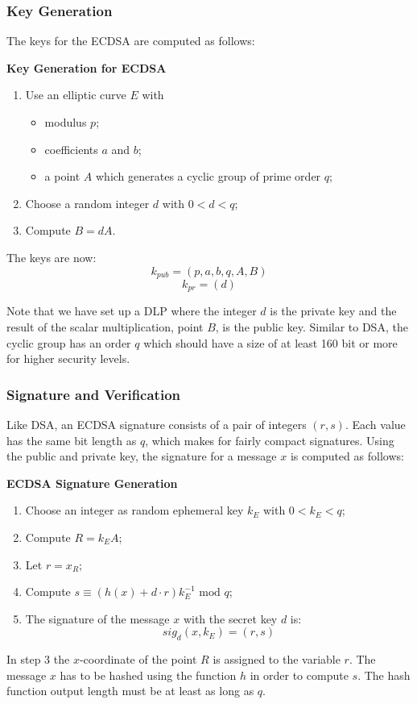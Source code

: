 \documentclass[11pt, a4paper]{article}
\newcommand{\mymod}{
    \text{ mod }
}
\begin{document}
\subsubsection*{Key Generation}
The keys for the ECDSA are computed as follows:
\begin{framed}
    \hfill\break\textbf{Key Generation for ECDSA}
    \begin{enumerate}
        \item Use an elliptic curve $E$ with
        \begin{itemize}
            \item modulus $p$;
            \item coefficients $a$ and $b$;
            \item a point $A$ which generates a cyclic group of prime order $q$;
        \end{itemize}
        \item Choose a random integer $d$ with $0<d<q$;
        \item Compute $B=dA$.
    \end{enumerate}
    The keys are now:
    $$k_{pub}=(p,a,b,q,A,B)$$
    $$k_{pr}=(d)$$
\end{framed}
Note that we have set up a DLP where the integer $d$ is the private key and the result of the scalar multiplication, point $B$, is the public key. Similar to DSA, the cyclic group has an order $q$ which should have a size of at least 160 bit or more for higher security levels.

\subsubsection*{Signature and Verification}
Like DSA, an ECDSA signature consists of a pair of integers $(r,s)$. Each value has the same bit length as $q$, which makes for fairly compact signatures. Using the public and private key, the signature for a message $x$ is computed as follows:
\begin{framed}
    \hfill\break\textbf{ECDSA Signature Generation}
    \begin{enumerate}
        \item Choose an integer as random ephemeral key $k_E$ with $0<k_E<q$;
        \item Compute $R=k_EA$;
        \item Let $r=x_R$;
        \item Compute $s\equiv (h(x)+d\cdot r)k_E^{-1}\mymod q$;
        \item The signature of the message $x$ with the secret key $d$ is:
        $$sig_d(x,k_E)=(r,s)$$
    \end{enumerate}
\end{framed}
In step 3 the $x$-coordinate of the point $R$ is assigned to the variable $r$. The message $x$ has to be hashed using the function $h$ in order to compute $s$. The hash function output length must be at least as long as $q$.
\end{document}
